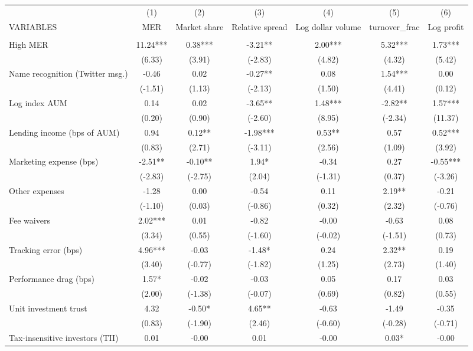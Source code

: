 \documentclass[]{article}
\begin{document}
\begin{tabular}{lcccccc} \hline
 & (1) & (2) & (3) & (4) & (5) & (6) \\
VARIABLES & MER & Market share & Relative spread & Log dollar volume & turnover\_frac & Log profit \\ \hline
 &  &  &  &  &  &  \\
High MER & 11.24*** & 0.38*** & -3.21** & 2.00*** & 5.32*** & 1.73*** \\
 & (6.33) & (3.91) & (-2.83) & (4.82) & (4.32) & (5.42) \\
Name recognition (Twitter msg.) & -0.46 & 0.02 & -0.27** & 0.08 & 1.54*** & 0.00 \\
 & (-1.51) & (1.13) & (-2.13) & (1.50) & (4.41) & (0.12) \\
Log index AUM & 0.14 & 0.02 & -3.65** & 1.48*** & -2.82** & 1.57*** \\
 & (0.20) & (0.90) & (-2.60) & (8.95) & (-2.34) & (11.37) \\
Lending income (bps of AUM) & 0.94 & 0.12** & -1.98*** & 0.53** & 0.57 & 0.52*** \\
 & (0.83) & (2.71) & (-3.11) & (2.56) & (1.09) & (3.92) \\
Marketing expense (bps) & -2.51** & -0.10** & 1.94* & -0.34 & 0.27 & -0.55*** \\
 & (-2.83) & (-2.75) & (2.04) & (-1.31) & (0.37) & (-3.26) \\
Other expenses & -1.28 & 0.00 & -0.54 & 0.11 & 2.19** & -0.21 \\
 & (-1.10) & (0.03) & (-0.86) & (0.32) & (2.32) & (-0.76) \\
Fee waivers & 2.02*** & 0.01 & -0.82 & -0.00 & -0.63 & 0.08 \\
 & (3.34) & (0.55) & (-1.60) & (-0.02) & (-1.51) & (0.73) \\
Tracking error (bps) & 4.96*** & -0.03 & -1.48* & 0.24 & 2.32** & 0.19 \\
 & (3.40) & (-0.77) & (-1.82) & (1.25) & (2.73) & (1.40) \\
Performance drag (bps) & 1.57* & -0.02 & -0.03 & 0.05 & 0.17 & 0.03 \\
 & (2.00) & (-1.38) & (-0.07) & (0.69) & (0.82) & (0.55) \\
Unit investment trust & 4.32 & -0.50* & 4.65** & -0.63 & -1.49 & -0.35 \\
 & (0.83) & (-1.90) & (2.46) & (-0.60) & (-0.28) & (-0.71) \\
Tax-insensitive investors (TII) & 0.01 & -0.00 & 0.01 & -0.00 & 0.03* & -0.00 \\

\end{tabular}
\end{document}
